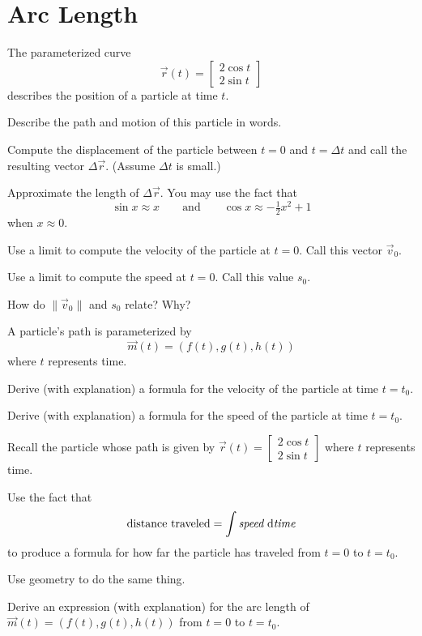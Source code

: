 \documentclass{problemset}
\newcommand{\mat}[1]{\begin{bmatrix}#1\end{bmatrix}}
\begin{document}
\section*{Arc Length}
	\vspace{-.5cm}
	\question
	The parameterized curve
	\[
		\vec r(t) = \mat{2\cos t\\2\sin t}
	\]
	describes the position of a particle at time $t$.
	\begin{parts}
		\item Describe the path and motion of this particle in words.
		\item Compute the displacement  of the particle between $t=0$
			and $t=\Delta t$ and call the resulting vector $\Delta \vec r$.  
			(Assume $\Delta t$ is small.)
		\item Approximate the length of $\Delta \vec r$.  You may use the fact that
			\[
				\sin x\approx x\qquad\text{and}\qquad \cos x\approx -\tfrac{1}{2}x^2+1
			\]
			when $x\approx 0$.
		\item Use a limit to compute the velocity of the particle at $t=0$. Call this 
			vector $\vec v_0$.
		\item Use a limit to compute the speed at $t=0$.  Call this value $s_0$.
		\item How do $\|\vec v_0\|$ and $s_0$ relate?  Why?
	\end{parts}

	\question
	A particle's path is parameterized by
	\[
		\vec m(t) = (f(t), g(t), h(t))
	\]
	where $t$ represents time.
	\begin{parts}
		\item Derive (with explanation) a formula for the velocity of
			the particle at time $t=t_0$.
		\item Derive (with explanation) a formula for the speed of
			the particle at time $t=t_0$.
	\end{parts}
	
	\question
	Recall the particle whose path is given by
	$
		\vec r(t) = \mat{2\cos t\\2\sin t}
	$
	where $t$ represents time.
	\begin{parts}
		\item Use the fact that
			\[
				\text{distance traveled}=\int\text{\it speed}\ \mathrm{d}\text{\it time}
			\]
		to produce a formula for how far the particle has traveled from $t=0$ to $t=t_0$.
		\item Use geometry to do the same thing.
		\item Derive an expression (with explanation) for the arc length of $\vec m(t) = (f(t), g(t), h(t))$
			from $t=0$ to $t=t_0$.
	\end{parts}
\end{document}
